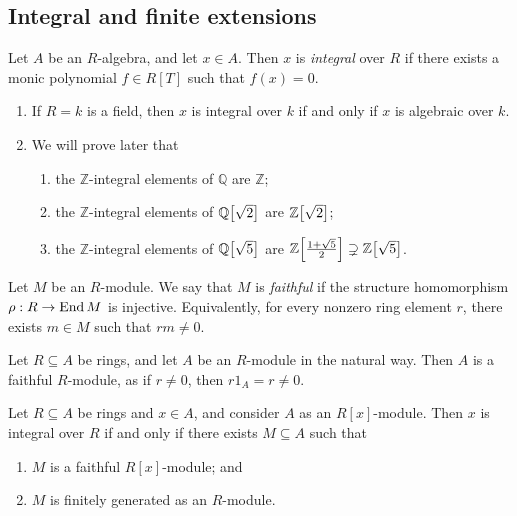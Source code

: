 \subsection{Integral and finite extensions}
\begin{definition}
    Let \( A \) be an \( R \)-algebra, and let \( x \in A \).
    Then \( x \) is \emph{integral} over \( R \) if there exists a monic polynomial \( f \in R[T] \) such that \( f(x) = 0 \).
\end{definition}
\begin{example}
    \begin{enumerate}
        \item If \( R = k \) is a field, then \( x \) is integral over \( k \) if and only if \( x \) is algebraic over \( k \).
        \item We will prove later that
        \begin{enumerate}
            \item the \( \mathbb Z \)-integral elements of \( \mathbb Q \) are \( \mathbb Z \);
            \item the \( \mathbb Z \)-integral elements of \( \mathbb Q\qty[\sqrt{2}] \) are \( \mathbb Z\qty[\sqrt{2}] \);
            \item the \( \mathbb Z \)-integral elements of \( \mathbb Q\qty[\sqrt{5}] \) are \( \mathbb Z\qty[\frac{1+\sqrt{5}}{2}] \supsetneq \mathbb Z\qty[\sqrt{5}] \).
        \end{enumerate}
    \end{enumerate}
\end{example}
\begin{definition}
    Let \( M \) be an \( R \)-module.
    We say that \( M \) is \emph{faithful} if the structure homomorphism \( \rho : R \to \operatorname{End} M \) is injective.
    Equivalently, for every nonzero ring element \( r \), there exists \( m \in M \) such that \( rm \neq 0 \).
\end{definition}
\begin{example}
    Let \( R \subseteq A \) be rings, and let \( A \) be an \( R \)-module in the natural way.
    Then \( A \) is a faithful \( R \)-module, as if \( r \neq 0 \), then \( r 1_A = r \neq 0 \).
\end{example}
\begin{proposition}
    Let \( R \subseteq A \) be rings and \( x \in A \), and consider \( A \) as an \( R[x] \)-module.
    Then \( x \) is integral over \( R \) if and only if there exists \( M \subseteq A \) such that
    \begin{enumerate}
        \item \( M \) is a faithful \( R[x] \)-module; and
        \item \( M \) is finitely generated as an \( R \)-module.
    \end{enumerate}
\end{proposition}
